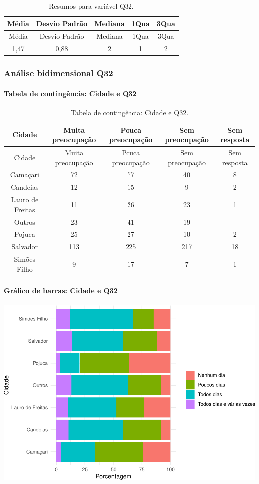 \documentclass[]{article}
\let\oldparagraph\paragraph
\renewcommand{\paragraph}[1]{\oldparagraph{#1}\mbox{}}
\begin{document}
\begin{longtable}[]{@{}ccccc@{}}
\caption{\label{tab:unnamed-chunk-1073}Resumos para variável Q32.}\tabularnewline
\toprule
Média & Desvio Padrão & Mediana & 1Qua & 3Qua\tabularnewline
\midrule
\endfirsthead
\toprule
Média & Desvio Padrão & Mediana & 1Qua & 3Qua\tabularnewline
\midrule
\endhead
1,47 & 0,88 & 2 & 1 & 2\tabularnewline
\bottomrule
\end{longtable}

\cleardoublepage

\hypertarget{anuxe1lise-bidimensional-q32}{%
\subsubsection{Análise bidimensional Q32}\label{anuxe1lise-bidimensional-q32}}

\hypertarget{tabela-de-continguxeancia-cidade-e-q32}{%
\paragraph{Tabela de contingência: Cidade e Q32}\label{tabela-de-continguxeancia-cidade-e-q32}}

\begin{longtable}[]{@{}ccccc@{}}
\caption{\label{tab:unnamed-chunk-1074}Tabela de contingência: Cidade e Q32.}\tabularnewline
\toprule
Cidade & Muita preocupação & Pouca preocupação & Sem preocupação & Sem resposta\tabularnewline
\midrule
\endfirsthead
\toprule
Cidade & Muita preocupação & Pouca preocupação & Sem preocupação & Sem resposta\tabularnewline
\midrule
\endhead
Camaçari & 72 & 77 & 40 & 8\tabularnewline
Candeias & 12 & 15 & 9 & 2\tabularnewline
Lauro de Freitas & 11 & 26 & 23 & 1\tabularnewline
Outros & 23 & 41 & 19 &\tabularnewline
Pojuca & 25 & 27 & 10 & 2\tabularnewline
Salvador & 113 & 225 & 217 & 18\tabularnewline
Simões Filho & 9 & 17 & 7 & 1\tabularnewline
\bottomrule
\end{longtable}

\hypertarget{gruxe1fico-de-barras-cidade-e-q32}{%
\paragraph{Gráfico de barras: Cidade e Q32}\label{gruxe1fico-de-barras-cidade-e-q32}}

\begin{center}\includegraphics[width=0.75\linewidth]{relatorio_covid19_files/figure-latex/unnamed-chunk-1075-1} \end{center}
\end{document}
